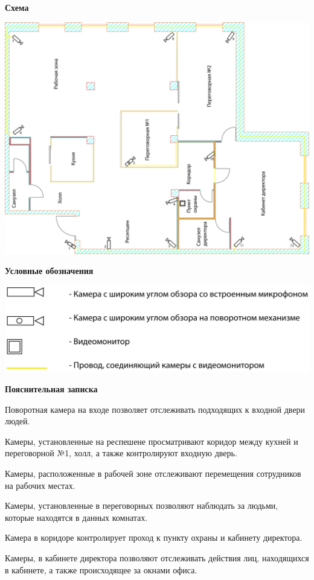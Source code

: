 \documentclass[a4paper,14pt]{extarticle}
\begin{document}
    \begin{center}
        \textbf{Схема}
    \end{center}
    \vspace{-6ex}
    \begin{center}
        \includegraphics[scale=0.65]{pics/Cams.png}
    \end{center}
    \textbf{Условные обозначения}
    \begin{center}
        \includegraphics[scale=0.65]{pics/Cams(mark).png}
    \end{center}
    \textbf{Пояснительная записка}
    \begin{spacing}{1.25}
        Поворотная камера на входе позволяет отслеживать подходящих к входной двери людей.

        Камеры, установленные на респешене просматривают коридор между кухней и переговорной №1, холл, а также контролируют входную дверь.

        Камеры, расположенные в рабочей зоне отслеживают перемещения сотрудников на рабочих местах. 

        Камеры, установленные в переговорных позволяют наблюдать за людьми, которые находятся в данных комнатах.

        Камера в коридоре контролирует проход к пункту охраны и кабинету директора.

        Камеры, в кабинете директора позволяют отслеживать действия лиц, находящихся в кабинете, а также происходящее за окнами офиса. 
    \end{spacing}
\end{document}
